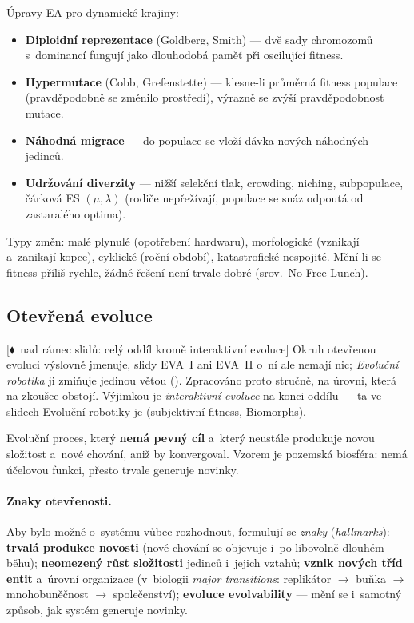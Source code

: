 \documentclass[11pt,a4paper]{article}
\theoremstyle{definition}
\newcommand{\mimoq}[1]{\textcolor{markcol}{\textsf{\footnotesize[$\blacklozenge$~nad rámec slidů: #1]}}}
\begin{document}
Úpravy EA pro dynamické krajiny:
\begin{itemize}
\item \textbf{Diploidní reprezentace} (Goldberg, Smith) --- dvě sady
  chromozomů s~dominancí fungují jako dlouhodobá paměť při oscilující fitness.
\item \textbf{Hypermutace} (Cobb, Grefenstette) --- klesne-li průměrná fitness
  populace (pravděpodobně se změnilo prostředí), výrazně se zvýší
  pravděpodobnost mutace.
\item \textbf{Náhodná migrace} --- do populace se vloží dávka nových
  náhodných jedinců.
\item \textbf{Udržování diverzity} --- nižší selekční tlak, crowding, niching,
  subpopulace, čárková ES $(\mu,\lambda)$ (rodiče nepřežívají, populace
  se snáz odpoutá od zastaralého optima).
\end{itemize}
Typy změn: malé plynulé (opotřebení hardwaru), morfologické (vznikají
a~zanikají kopce), cyklické (roční období), katastrofické nespojité.
Mění-li se fitness příliš rychle, žádné řešení není trvale dobré
(srov.\ No Free Lunch).

\subsection{Otevřená evoluce}
\label{ssec:otevrena}

\noindent\mimoq{celý oddíl kromě interaktivní evoluce} Okruh otevřenou evoluci výslovně
jmenuje, slidy EVA~I ani EVA~II o~ní ale nemají nic; \emph{Evoluční robotika} ji zmiňuje
jedinou větou ().
Zpracováno proto stručně, na úrovni, která na zkoušce obstojí. Výjimkou je
\emph{interaktivní evoluce} na konci oddílu --- ta ve slidech Evoluční robotiky je
(subjektivní fitness, Biomorphs).

\begin{defbox}
Evoluční proces, který \textbf{nemá pevný cíl} a~který neustále produkuje novou složitost
a~nové  chování, aniž by konvergoval. Vzorem je pozemská biosféra: nemá účelovou
funkci, přesto trvale generuje novinky.
\end{defbox}

\paragraph{Znaky otevřenosti.} Aby bylo možné o~systému vůbec rozhodnout, formulují se
\emph{znaky} (\emph{hallmarks}): \textbf{trvalá produkce novosti} (nové chování se objevuje
i~po libovolně dlouhém běhu); \textbf{neomezený růst složitosti} jedinců i~jejich vztahů;
\textbf{vznik nových tříd entit} a~úrovní organizace (v~biologii \emph{major transitions}:
replikátor $\to$ buňka $\to$ mnohobuněčnost $\to$ společenství); \textbf{evoluce
evolvability} --- mění se i~samotný způsob, jak systém generuje novinky.
\end{document}
